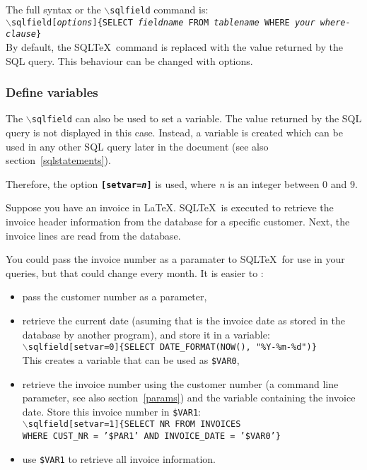 \documentclass{article}
\newcommand{\bs}{\ensuremath{\backslash}}
\newcommand{\vs}{\vspace{3mm}}
\begin{document}
The full syntax or the \texttt{\bs sqlfield} command is:\\
\texttt{\bs sqlfield[\textit{options}]\{SELECT \textit{fieldname} FROM \textit{tablename} WHERE \textit{your where-clause}\}} \\
By default, the SQL\TeX\ command is replaced with the value returned by the SQL query. This behaviour
can be changed with options.


\subsubsection{Define variables}\label{vars}

The \texttt{\bs sqlfield} can also be used to set a variable. The value returned by the SQL query is not
displayed in this case. Instead, a variable is created which can be used in any other SQL query later in
the document (see also section~\ref{sqlstatements}).

Therefore, the option \texttt{\textbf{[setvar=\textit{n}]}} is used, where \textit{n} is an integer between
0 and 9.

\vs

Suppose you have an invoice in \LaTeX. SQL\TeX\ is executed to retrieve the invoice header information
from the database for a specific customer. Next, the invoice lines are read from the database.

You could pass the invoice number as a paramater to SQL\TeX\ for use in your queries, but that could
change every month. It is easier to :\\
\begin{itemize}
\item pass the customer number as a parameter,
\item retrieve the current date (asuming that is the invoice date as stored in
the database by another program), and store it in a variable: \\
\texttt{\bs sqlfield[setvar=0]\{SELECT DATE\_FORMAT(NOW(), "\%Y-\%m-\%d")\}} \\
This creates a variable that can be used as \texttt{\$VAR0},
\item retrieve the invoice number using the customer number (a command line parameter,
see also section~\ref{params}) and the variable containing the invoice date.
Store this invoice number in \texttt{\$VAR1}: \\
\texttt{\bs sqlfield[setvar=1]\{SELECT NR FROM INVOICES \\
WHERE CUST\_NR = '\$PAR1' AND INVOICE\_DATE = '\$VAR0'\}}
\item use \texttt{\$VAR1} to retrieve all invoice information.
\end{itemize}
\end{document}
